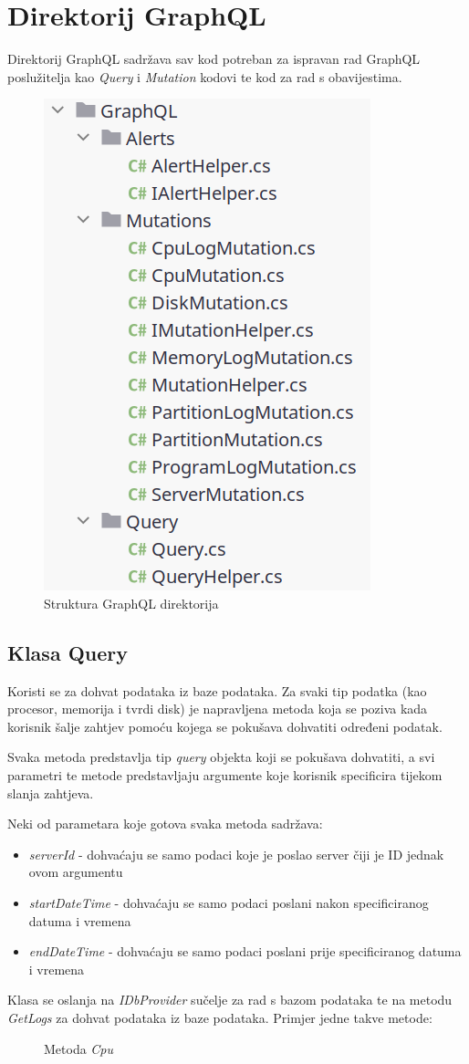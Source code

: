 \documentclass[zavrsnirad]{fer}
\begin{document}
\section{Direktorij GraphQL}
\label{pog:graphql_dir}
Direktorij GraphQL sadržava sav kod potreban za ispravan rad GraphQL poslužitelja kao \textit{Query} i \textit{Mutation} kodovi te kod za rad s obavijestima.

\begin{figure}[htb!]
	\centering
	\includegraphics[width=0.4\linewidth]{images/graphql_dir_structure.png} 
	\caption{Struktura GraphQL direktorija}
\label{slk:graphql_dir_structure}
\end{figure}
\FloatBarrier

\subsection{Klasa Query}
\label{pog:query.cs}
Koristi se za dohvat podataka iz baze podataka. Za svaki tip podatka (kao procesor, memorija i tvrdi disk) je napravljena metoda koja se poziva kada korisnik šalje zahtjev pomoću kojega se pokušava dohvatiti određeni podatak.

Svaka metoda predstavlja tip \textit{query} objekta koji se pokušava dohvatiti, a svi parametri te metode predstavljaju argumente koje korisnik specificira tijekom slanja zahtjeva.

Neki od parametara koje gotova svaka metoda sadržava:
\begin{itemize}
	\item \textit{serverId} - dohvaćaju se samo podaci koje je poslao server čiji je ID jednak ovom argumentu
	\item \textit{startDateTime} - dohvaćaju se samo podaci poslani nakon specificiranog datuma i vremena
	\item \textit{endDateTime} - dohvaćaju se samo podaci poslani prije specificiranog datuma i vremena
\end{itemize}
Klasa se oslanja na \textit{IDbProvider} sučelje za rad s bazom podataka te na metodu \textit{GetLogs} za dohvat podataka iz baze podataka. Primjer jedne takve metode:
\begin{figure}[htb]
	\centering
	
	\caption{Metoda \textit{Cpu}}
\end{figure}
\FloatBarrier
\end{document}
